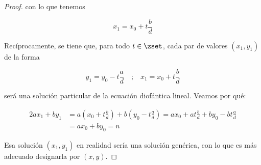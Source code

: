 \begin{proof}
  \noindent con lo que tenemos

  $$ x_1 = x_0 + t \frac{b}{d} $$

  Recíprocamente, se tiene que, para todo $t \in \zset$, cada par de valores
  $(x_1, y_1)$ de la forma

  $$ y_1 = y_0 - t \frac{a}{d} \quad \text{;} \quad x_1 = x_0 + t
  \frac{b}{d} $$

  \noindent será una solución particular de la ecuación diofántica lineal.
  Veamos por qué:

  \begin{alignat*}{2}
    ax_1 + by_1   &= a\left(x_0 + t\frac{b}{d}\right) + b\left(y_0 -
      t\frac{a}{d}\right) = ax_0 + at\frac{b}{d} + by_0 - bt\frac{a}{d} \\
                  &= ax_0 + by_0 = n
  \end{alignat*}

  Esa solución $(x_1, y_1)$ en realidad sería una solución genérica, con lo
  que es más adecuado designarla por $(x, y)$.
\end{proof}










